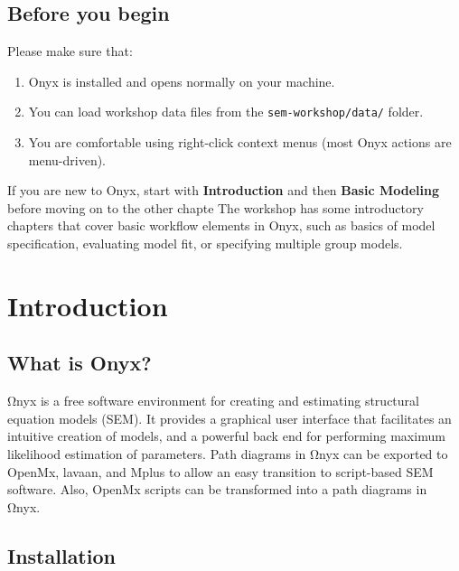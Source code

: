 \documentclass[
  letterpaper,
  DIV=11,
  numbers=noendperiod]{scrreprt}
\providecommand{\tightlist}{%
  \setlength{\itemsep}{0pt}\setlength{\parskip}{0pt}}\usepackage{longtable,booktabs,array}
\begin{document}
\section*{Before you begin}\label{before-you-begin}


Please make sure that:

\begin{enumerate}
\def\labelenumi{\arabic{enumi}.}
\tightlist
\item
  Onyx is installed and opens normally on your machine.
\item
  You can load workshop data files from the \texttt{sem-workshop/data/}
  folder.
\item
  You are comfortable using right-click context menus (most Onyx actions
  are menu-driven).
\end{enumerate}

If you are new to Onyx, start with \textbf{Introduction} and then
\textbf{Basic Modeling} before moving on to the other chapte The
workshop has some introductory chapters that cover basic workflow
elements in Onyx, such as basics of model specification, evaluating
model fit, or specifying multiple group models.


\chapter{Introduction}\label{introduction}

\section{What is Onyx?}\label{what-is-onyx}

Ωnyx is a free software environment for creating and estimating
structural equation models (SEM). It provides a graphical user interface
that facilitates an intuitive creation of models, and a powerful back
end for performing maximum likelihood estimation of parameters. Path
diagrams in Ωnyx can be exported to OpenMx, lavaan, and Mplus to allow
an easy transition to script-based SEM software. Also, OpenMx scripts
can be transformed into a path diagrams in Ωnyx.

\section{Installation}\label{installation}
\end{document}
